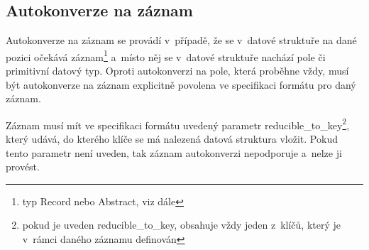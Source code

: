 \documentclass[FM,bw,DP]{tulthesis}
\begin{document}
\subsection{Autokonverze na záznam}
\label{sec:analyza-autokonverze-zaznam}

Autokonverze na záznam se provádí v~případě, že se v~datové struktuře na dané pozici očekává záznam\footnote{typ Record nebo Abstract, viz dále} a~místo něj se v~datové struktuře nachází pole či primitivní datový typ. Oproti autokonverzi na pole, která proběhne vždy, musí být autokonverze na záznam explicitně povolena ve specifikaci formátu pro daný záznam.

Záznam musí mít ve specifikaci formátu uvedený parametr reducible\_to\_key\footnote{pokud je uveden reducible\_to\_key, obsahuje vždy jeden z~klíčů, který je v~rámci daného záznamu definován}, který udává, do kterého klíče se má nalezená datová struktura vložit. Pokud tento parametr není uveden, tak záznam autokonverzi nepodporuje a~nelze ji provést.
\end{document}

